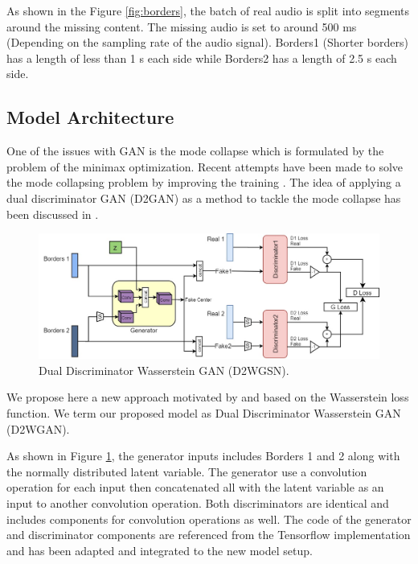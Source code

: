 \documentclass{article} %
\begin{document}
As shown in the Figure \ref{fig:borders}, the batch of real audio is split into segments around the missing content. The missing audio is set to around 500 ms (Depending on the sampling rate of the audio signal). Borders1 (Shorter borders) has a length of less than 1 s each side while Borders2 has a length of 2.5 s each side.

\subsection{Model Architecture}
One of the issues with GAN is the mode collapse which is formulated by the problem of the minimax optimization. Recent attempts have been made to solve the mode collapsing problem by improving the training \cite{Hoang2017MultiGenerator}. The idea of applying a dual discriminator GAN (D2GAN) as a method to tackle the mode collapse has been discussed in \cite{nguyen2017dual}.

\begin{figure}[h]
    \includegraphics[scale=0.36]{images/model_extend2.jpg}
    \centering
    \caption{Dual Discriminator Wasserstein GAN (D2WGSN).}
    \label{fig:extendedmodel}
\end{figure}

We propose here a new approach motivated by \cite{nguyen2017dual} and based on the Wasserstein loss function. We term our proposed model as Dual Discriminator Wasserstein GAN (D2WGAN).

As shown in Figure \ref{fig:extendedmodel}, the generator inputs includes Borders 1 and 2 along with the normally distributed latent variable. The generator use a convolution operation for each input then concatenated all with the latent variable as an input to another convolution operation. Both discriminators are identical and includes components for convolution operations as well. The code of the generator and discriminator components are referenced from the Tensorflow implementation \cite{codegan} and has been adapted and integrated to the new model setup.
\end{document}
